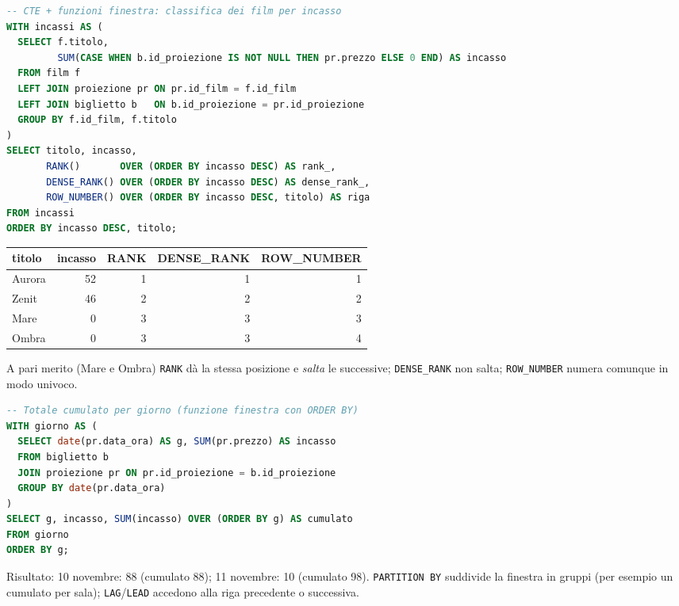 \begin{lstlisting}[language=SQL, caption={Classifica con RANK, DENSE\_RANK e ROW\_NUMBER}]
-- CTE + funzioni finestra: classifica dei film per incasso
WITH incassi AS (
  SELECT f.titolo,
         SUM(CASE WHEN b.id_proiezione IS NOT NULL THEN pr.prezzo ELSE 0 END) AS incasso
  FROM film f
  LEFT JOIN proiezione pr ON pr.id_film = f.id_film
  LEFT JOIN biglietto b   ON b.id_proiezione = pr.id_proiezione
  GROUP BY f.id_film, f.titolo
)
SELECT titolo, incasso,
       RANK()       OVER (ORDER BY incasso DESC) AS rank_,
       DENSE_RANK() OVER (ORDER BY incasso DESC) AS dense_rank_,
       ROW_NUMBER() OVER (ORDER BY incasso DESC, titolo) AS riga
FROM incassi
ORDER BY incasso DESC, titolo;
\end{lstlisting}
\begin{center}
\small
\begin{tabular}{@{}lrrrr@{}}
\toprule
\textbf{titolo} & \textbf{incasso} & \textbf{RANK} & \textbf{DENSE\_RANK} & \textbf{ROW\_NUMBER} \\
\midrule
Aurora & 52 & 1 & 1 & 1 \\
Zenit & 46 & 2 & 2 & 2 \\
Mare & 0 & 3 & 3 & 3 \\
Ombra & 0 & 3 & 3 & 4 \\
\bottomrule
\end{tabular}
\end{center}
A pari merito (Mare e Ombra) \texttt{RANK} dà la stessa posizione e \emph{salta} le successive; \texttt{DENSE\_RANK} non salta; \texttt{ROW\_NUMBER} numera comunque in modo univoco.

\begin{lstlisting}[language=SQL, caption={Totale cumulato con una funzione finestra}]
-- Totale cumulato per giorno (funzione finestra con ORDER BY)
WITH giorno AS (
  SELECT date(pr.data_ora) AS g, SUM(pr.prezzo) AS incasso
  FROM biglietto b
  JOIN proiezione pr ON pr.id_proiezione = b.id_proiezione
  GROUP BY date(pr.data_ora)
)
SELECT g, incasso, SUM(incasso) OVER (ORDER BY g) AS cumulato
FROM giorno
ORDER BY g;
\end{lstlisting}
Risultato: 10 novembre: 88 (cumulato 88); 11 novembre: 10 (cumulato 98). \texttt{PARTITION BY} suddivide la finestra in gruppi (per esempio un cumulato per sala); \texttt{LAG}/\texttt{LEAD} accedono alla riga precedente o successiva.

